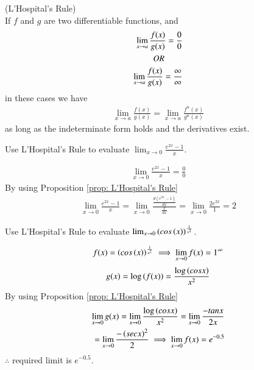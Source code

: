 \documentclass[journal,12pt,twocolumn]{IEEEtran}
\begin{document}
\begin{proposition}
\label{prop: L'Hospital's Rule}
(L'Hospital's Rule) \\ If $f$ and $g$ are two differentiable functions, and 
\begin{align}
\lim_{x \to a}{\frac{f(x)}{g(x)}}=\frac{0}{0} \\
  OR  \hspace{0.75cm}\\ 
\lim_{x \to a}{\frac{f(x)}{g(x)}}=\frac{\infty}{\infty}
\end{align}
in these cases we have 
\begin{align}
\lim_{x \to a}{\frac{f(x)}{g(x)}}=\lim_{x \to a}{\frac{f^n(x)}{g^n(x)}}
\end{align}
as long as the indeterminate form holds and the derivatives exist.
\end{proposition}
\begin{problem}
Use L'Hospital's Rule to evaluate $\lim_{x \to 0}{\frac{e^{2x}-1}{x}}$.
\end{problem}
\solution  
\begin{align}
\lim_{x \to 0}{\frac{e^{2x}-1}{x}}=\frac{0}{0}
\end{align}
By using Proposition \ref{prop: L'Hospital's Rule}
\begin{align}
\lim_{x \to 0}{\frac{e^{2x}-1}{x}}=\lim_{x \to 0}{\frac{\frac{d(e^{2x}-1)}{dx}}{\frac{x}{dx}}}=
   \lim_{x \to 0}{\frac{2e^{2x}}{1}}=2
\end{align}

\begin{problem}
Use L'Hospital's Rule to evaluate $\lim_{x \to 0}{\left(cos\left(x\right)\right)^{\frac{1}{x^2}}}$.
\end{problem}
\solution  
\begin{align}
f(x)=\left(cos\left(x\right)\right)^{\frac{1}{x^2}}
\implies
\lim_{x \to 0}{f(x)}=1^\infty
\end{align}
\begin{align}
g(x)=\log\left(f(x)\right)=\frac{\log\left(cosx\right)}{x^2}
\end{align}
By using Proposition \ref{prop: L'Hospital's Rule}
\begin{align}
\lim_{x \to 0}{g(x)}=\lim_{x \to 0}{\frac{\log\left(cosx\right)}{x^2}}=\lim_{x \to 0}{\frac{-tanx}{2x}}
\\=\lim_{x \to 0}{\frac{-\left(secx\right)^2}{2}}
\implies\lim_{x \to 0}{f(x)}=e^{-0.5}
\end{align}
$\therefore$ required limit is $e^{-0.5}$.
\end{document}
